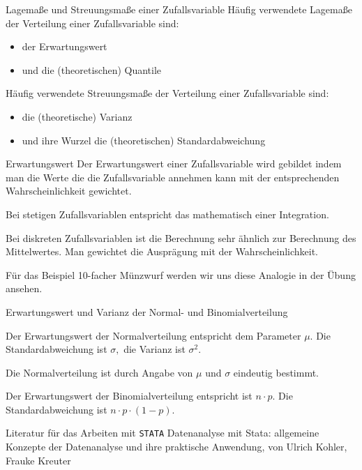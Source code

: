 \documentclass[usenames,dvipsnames,handout]{beamer}
\begin{document}
\begin{frame}{Lagemaße und Streuungsmaße einer Zufallsvariable}
Häufig verwendete  Lagemaße der Verteilung einer Zufallsvariable sind:
\begin{itemize}
\item{der Erwartungswert}
\item{und die (theoretischen) Quantile}
\end{itemize}
Häufig verwendete Streuungsmaße der Verteilung einer Zufallsvariable sind:
\begin{itemize}
\item{die (theoretische) Varianz}
\item{und ihre Wurzel die (theoretischen) Standardabweichung}
\end{itemize}
\end{frame}

\begin{frame}{Erwartungswert}
Der Erwartungswert einer Zufallsvariable wird gebildet indem man die Werte die die Zufallsvariable annehmen kann mit der entsprechenden
Wahrscheinlichkeit gewichtet.
\begin{description}
\item{Bei stetigen Zufallsvariablen entspricht das mathematisch einer Integration.}\pause
\item{Bei diskreten Zufallsvariablen ist die Berechnung sehr ähnlich zur Berechnung des Mittelwertes. Man gewichtet die Ausprägung mit der Wahrscheinlichkeit.}\pause
\item{Für das Beispiel 10-facher Münzwurf werden wir uns diese Analogie in der Übung ansehen.}
\end{description}
\end{frame}

\begin{frame}{Erwartungswert und Varianz der Normal- und Binomialverteilung}
\begin{description}
\item{Der Erwartungswert der Normalverteilung entspricht dem Parameter $\mu.$ Die Standardabweichung ist $\sigma,$
die Varianz ist $\sigma^{2}.$}
\item{Die Normalverteilung ist durch Angabe von $\mu$ und $\sigma$ eindeutig bestimmt.}
\item{Der Erwartungswert der Binomialverteilung entspricht ist $n \cdot p.$ Die Standardabweichung ist $n \cdot p \cdot (1-p).$
}
\end{description}
\end{frame}

\begin{frame}{Literatur für das Arbeiten mit \texttt{STATA}}
Datenanalyse mit Stata: allgemeine Konzepte der Datenanalyse und ihre praktische Anwendung,
von Ulrich Kohler, Frauke Kreuter
\end{frame}
\end{document}
